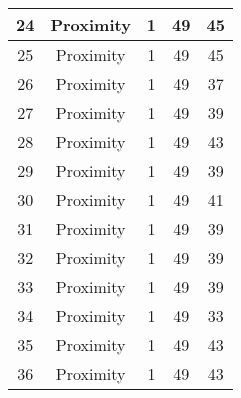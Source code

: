 \documentclass[results.tex]{subfiles}
\begin{document}
\begin{center}
\begin{tabular}{| c || c | c | c | c |}
            \hline
            24                      & Proximity                    & 1                      & 49                      & 45                   \\
            \hline
            25                      & Proximity                    & 1                      & 49                      & 45                   \\
            \hline
            26                      & Proximity                    & 1                      & 49                      & 37                   \\
            \hline
            27                      & Proximity                    & 1                      & 49                      & 39                   \\
            \hline
            28                      & Proximity                    & 1                      & 49                      & 43                   \\
            \hline
            29                      & Proximity                    & 1                      & 49                      & 39                   \\
            \hline
            30                      & Proximity                    & 1                      & 49                      & 41                   \\
            \hline
            31                      & Proximity                    & 1                      & 49                      & 39                   \\
            \hline
            32                      & Proximity                    & 1                      & 49                      & 39                   \\
            \hline
            33                      & Proximity                    & 1                      & 49                      & 39                   \\
            \hline
            34                      & Proximity                    & 1                      & 49                      & 33                   \\
            \hline
            35                      & Proximity                    & 1                      & 49                      & 43                   \\
            \hline
            36                      & Proximity                    & 1                      & 49                      & 43                   \\

\end{tabular}
\end{center}
\end{document}
